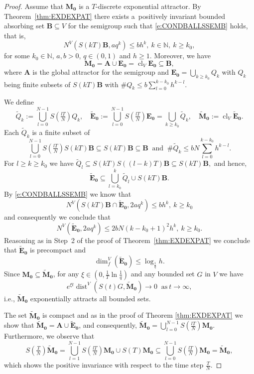 \documentclass[a4paper,12pt,reqno]{amsart}
\theoremstyle{plain}
\theoremstyle{definition}
\numberwithin{equation}{section}
\newcommand{\N}{\mathbb{N}}
\newcommand{\dist}{\operatorname{dist}}
\newcommand{\dimf}{\operatorname{dim}_{f}}
\newcommand{\cl}{\operatorname{cl}}
\renewcommand{\geq}{\geqslant}
\renewcommand{\leq}{\leqslant}
\begin{document}
\begin{proof}
Assume that $\mathbf{M_0}$ is a $T$-discrete exponential attractor. By Theorem~\ref{thm:EXDEXPAT} there exists a~positively invariant bounded absorbing set $\mathbf{B}\subseteq V$ for the semigroup such that \eqref{e:CONDBALLSSEMB} holds, that is,
\begin{equation*}
N^{V}(S(kT)\mathbf{B},aq^{k})\leq b h^{k},\ k\in\N,\ k\geq k_0,
\end{equation*}
for some $k_0\in\N$, $a,b>0$, $q\in(0,1)$ and $h\geq 1$. Moreover, we have
$$\mathbf{M_0}=\mathbf{A}\cup\mathbf{E_0}=\cl_{V}\mathbf{E_0}\subseteq \mathbf{B},$$
where $\mathbf{A}$ is the global attractor for the semigroup and $\displaystyle\mathbf{E_0}=\bigcup_{k\geq k_0}Q_k$
with $Q_k$ being finite subsets of $S(kT)\mathbf{B}$ with $\displaystyle\# Q_{k}\leq b\sum_{l=0}^{k-k_0}h^{k-l}$.

We define 
$$\widetilde{Q}_{k}:=\bigcup_{l=0}^{N-1}S\left(\tfrac{lT}{N}\right)Q_k,\quad \mathbf{\widetilde{E}_0}:=\bigcup_{l=0}^{N-1}S\left(\tfrac{lT}{N}\right)\mathbf{E_0}=\bigcup_{k\geq k_0}\widetilde{Q}_{k},\quad \mathbf{\widetilde{M}_0}:=\cl_{V}\mathbf{\widetilde{E}_0}.$$
Each $\widetilde{Q}_{k}$ is a finite subset of 
$$\bigcup_{l=0}^{N-1}S\left(\tfrac{lT}{N}\right)S(kT)\mathbf{B}\subseteq S(kT)\mathbf{B}\subseteq\mathbf{B}\ \text{ and }\ \#\widetilde{Q}_{k}\leq bN\sum_{l=0}^{k-k_0}h^{k-l}.$$
For $l\geq k\geq k_0$ we have
$\widetilde{Q}_{l}\subseteq S(kT)S((l-k)T)\mathbf{B}\subseteq S(kT)\mathbf{B},$
and hence,
$$\mathbf{\widetilde{E}_0}\subseteq \bigcup_{l=k_0}^{k}\widetilde{Q}_{l}\cup S(kT)\mathbf{B}.$$
By \eqref{e:CONDBALLSSEMB} we know that
$$N^{V}(S(kT)\mathbf{B}\cap\mathbf{\widetilde{E}_0},2aq^{k})\leq bh^{k},\ k\geq k_0$$
and consequently we conclude that
$$N^{V}(\mathbf{\widetilde{E}_0},2aq^{k})\leq 2bN(k-k_0+1)^{2}h^{k},\ k\geq k_0.$$
Reasoning as in Step~2 of the proof of Theorem~\ref{thm:EXDEXPAT} we conclude that $\mathbf{\widetilde{E}_0}$ is precompact and
\begin{equation}\label{e:ESTTILDEE0}
\dimf^{V}(\mathbf{\widetilde{E}_0})\leq\log_{\frac{1}{q}}h.
\end{equation}
Since $\mathbf{M_0}\subseteq\mathbf{\widetilde{M}_0}$, for any $\xi\in(0,\frac{1}{T}\ln{\frac{1}{q}})$ and any  bounded set $G$ in $V$ we have
$$e^{\xi t}\dist^{V}(S(t)G,\mathbf{\widetilde{M}_0})\to 0\ \text{ as}\ t\to\infty,$$
i.e., $\mathbf{\widetilde{M}_0}$ exponentially attracts all bounded sets. 

The set $\mathbf{\widetilde{M}_0}$ is compact and as in the proof of Theorem \ref{thm:EXDEXPAT} we show that 
$\mathbf{\widetilde{M}_0}=\mathbf{A}\cup\mathbf{\widetilde{E}_0}$, and consequently, 
$\mathbf{\widetilde{M}_0}=\bigcup_{l=0}^{N-1}S\left(\tfrac{lT}{N}\right)\mathbf{M_0}.$
Furthermore, we observe that
$$S(\tfrac{T}{N})\mathbf{\widetilde{M}_0}=\bigcup_{l=1}^{N-1}S(\tfrac{lT}{N})\mathbf{M_0}\cup S(T)\mathbf{M_0}\subseteq\bigcup_{l=0}^{N-1}S(\tfrac{lT}{N})\mathbf{M_0}=\mathbf{\widetilde{M}_0},$$
which shows the positive invariance with respect to the time step $\frac{T}{N}$. 


\end{proof}
\end{document}
